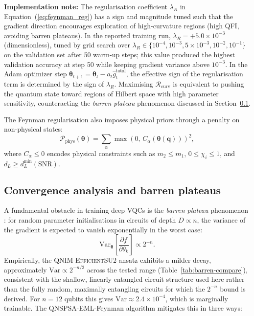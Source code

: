 \documentclass[11pt,a4paper, english]{book}
\theoremstyle{plain}
\theoremstyle{definition}
\numberwithin{equation}{chapter}
\numberwithin{figure}{chapter}
\numberwithin{table}{chapter}
\begin{document}
\noindent\textbf{Implementation note:} The regularisation coefficient
$\lambda_R$ in Equation~(\ref{eq:feynman_reg}) has a sign and magnitude tuned
such that the gradient direction encourages exploration of high-curvature
regions (high QFI, avoiding barren plateaus).
In the reported training run, $\lambda_R = +5.0 \times 10^{-3}$ (dimensionless), tuned by grid search over $\lambda_R \in \{10^{-4}, 10^{-3}, 5\times10^{-3}, 10^{-2}, 10^{-1}\}$ on the validation set after 50 warm-up steps; this value produced the highest validation accuracy at step 50 while keeping gradient variance above $10^{-3}$.
In the Adam optimizer step $\boldsymbol{\theta}_{t+1} = \boldsymbol{\theta}_t - a_t \hat{g}^\mathrm{total}_t$,
the effective sign of the regularisation term is determined by the sign of
$\lambda_R$. Maximising $\mathcal{R}_\mathrm{curv}$ is equivalent to pushing the
quantum state toward regions of Hilbert space with high parameter
sensitivity, counteracting the \emph{barren plateau} phenomenon
discussed in Section~\ref{subsec:barren-plateaus}.

The Feynman regularisation also imposes physical priors through a
penalty on non-physical states:
\begin{equation}
  \label{eq:physical_prior}
  \mathcal{P}_\mathrm{phys}(\boldsymbol{\theta}) =
    \sum_{\alpha}\max\!\left(0,\,
    C_\alpha(\boldsymbol{\theta}(\mathbf{q})) \right)^2,
\end{equation}
where $C_\alpha \leq 0$ encodes physical constraints such as
$m_2 \leq m_1$, $0 \leq \chi_i \leq 1$, and
$d_L \geq d_L^\mathrm{min}(\mathrm{SNR})$.

\subsection{Convergence analysis and barren plateaus}
\label{subsec:barren-plateaus}

A fundamental obstacle in training deep VQCs is the \emph{barren plateau}
phenomenon \cite{Cerezo_2021}: for random parameter initialisations in
circuits of depth $D \propto n$, the variance of the gradient is expected
to vanish exponentially in the worst case:
\begin{equation}
  \label{eq:barren_plateau}
  \mathrm{Var}_{\boldsymbol{\theta}}\!\left[
    \frac{\partial f}{\partial\theta_k}
  \right] \propto 2^{-n}.
\end{equation}
Empirically, the QNIM \textsc{EfficientSU2} ansatz exhibits a milder decay,
approximately $\mathrm{Var}\propto2^{-n/2}$ across the tested range
(Table~\ref{tab:barren-compare}), consistent with the shallow, linearly
entangled circuit structure used here rather than the fully random,
maximally entangling circuits for which the $2^{-n}$ bound is derived.
For $n=12$ qubits this gives $\mathrm{Var} \approx 2.4\times10^{-4}$,
which is marginally trainable.  The QNSPSA-EML-Feynman algorithm mitigates
this in three ways:
\end{document}
